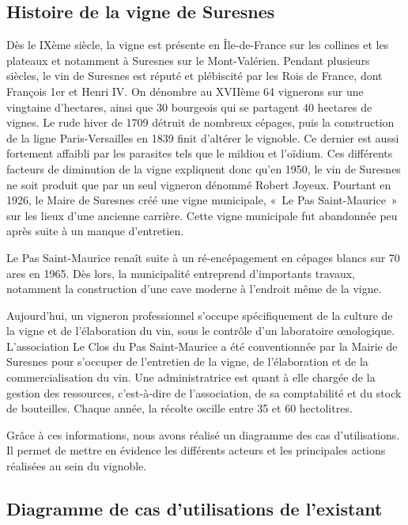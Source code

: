 \documentclass[a4paper, titlepage]{report}
\begin{document}
\subsection{Histoire de la vigne de Suresnes}\label{histoire-de-la-vigne-de-suresnes}

Dès le IXème siècle, la vigne est présente en Île-de-France sur les
collines et les plateaux et notamment à Suresnes sur le Mont-Valérien.
Pendant plusieurs siècles, le vin de Suresnes est réputé et plébiscité
par les Rois de France, dont François 1er et Henri IV. On dénombre au
XVIIème 64 vignerons sur une vingtaine d'hectares, ainsi que 30
bourgeois qui se partagent 40 hectares de vignes. Le rude hiver de 1709
détruit de nombreux cépages, puis la construction de la ligne
Paris-Versailles en 1839 finit d'altérer le vignoble. Ce dernier est
aussi fortement affaibli par les parasites tels que le mildiou et
l'oïdium. Ces différents facteurs de diminution de la vigne expliquent
donc qu'en 1950, le vin de Suresnes ne soit produit que par un seul
vigneron dénommé Robert Joyeux. Pourtant en 1926, le Maire de Suresnes
créé une vigne municipale, «~Le Pas Saint-Maurice~» sur les lieux d'une
ancienne carrière. Cette vigne municipale fut abandonnée peu après suite
à un manque d'entretien.

Le Pas Saint-Maurice renaît suite à un ré-encépagement en cépages blancs
sur 70 ares en 1965. Dès lors, la municipalité entreprend d'importants
travaux, notamment la construction d'une cave moderne à l'endroit même
de la vigne.

Aujourd'hui, un vigneron professionnel s'occupe spécifiquement de la
culture de la vigne et de l'élaboration du vin, sous le contrôle d'un
laboratoire œnologique. L'association Le Clos du Pas Saint-Maurice a été
conventionnée par la Mairie de Suresnes pour s'occuper de l'entretien de
la vigne, de l'élaboration et de la commercialisation du vin. Une
administratrice est quant à elle chargée de la gestion des ressources,
c'est-à-dire de l'association, de sa comptabilité et du stock de
bouteilles. Chaque année, la récolte oscille entre 35 et 60 hectolitres.

Grâce à ces informations, nous avons réalisé un diagramme des cas
d'utilisations. Il permet de mettre en évidence les différents acteurs
et les principales actions réalisées au sein du vignoble.

\clearpage
\subsection{Diagramme de cas d'utilisations de l'existant}\label{diagramme-de-cas-dutilisations-de-lexistant}
\end{document}
